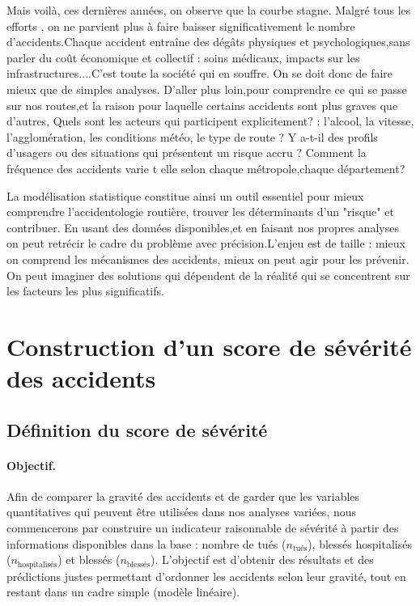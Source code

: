 \documentclass[11pt,a4paper]{article}
\begin{document}
Mais voilà, ces dernières années, on observe que la courbe stagne. Malgré tous les efforts , on ne parvient plus à faire baisser significativement le nombre d'accidents.Chaque accident entraîne des dégâts physiques et psychologiques,sans parler du coût économique et collectif : soins médicaux, impacts sur les infrastructures....C'est toute la société qui en souffre.
On se doit donc de faire mieux que de simples analyses. D'aller plus loin,pour comprendre ce qui se passe sur nos routes,et la raison pour laquelle certains accidents sont plus graves que d'autres, Quels sont les acteurs qui participent explicitement? : l'alcool, la vitesse, l'agglomération, les conditions météo, le type de route ? Y a-t-il des profils d'usagers ou des situations qui présentent un risque accru ? Comment la fréquence des accidents varie t elle selon chaque métropole,chaque département? 

La modélisation statistique constitue ainsi un outil essentiel pour mieux comprendre l’accidentologie routière, trouver les déterminants d'un "risque" et contribuer. En usant des données disponibles,et en faisant nos propres analyses  on peut retrécir le cadre du problème avec précision.L'enjeu est de taille : mieux on comprend les mécanismes des accidents, mieux on peut agir pour les prévenir. On peut imaginer des solutions qui dépendent de la réalité qui se concentrent sur les facteurs les plus significatifs.

\section{Construction d’un score de sévérité des accidents}


\subsection{Définition du score de sévérité}

\paragraph{Objectif.}
Afin de comparer la gravité des accidents et de garder que les variables quantitatives qui peuvent être utilisées dans nos
analyses variées, nous commencerons par construire un indicateur raisonnable de sévérité à partir des informations
disponibles dans la base : nombre de tués ($n_{\text{tués}}$), blessés hospitalisés ($n_{\text{hospitalisés}}$) et
blessés ($n_{\text{blessés}}$). L’objectif est d’obtenir des résultats et des prédictions justes permettant d’ordonner les accidents
selon leur gravité, tout en restant dans un cadre simple  (modèle linéaire).
\end{document}
